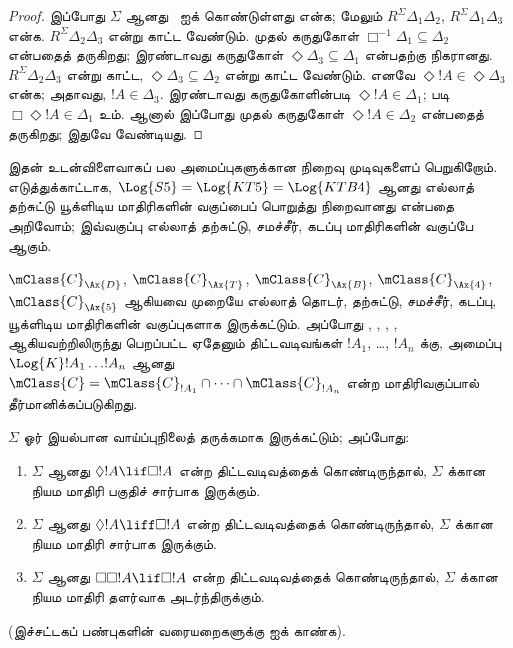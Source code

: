\documentclass[../../../include/open-logic-section]{subfiles}
\begin{document}
\begin{proof}
  இப்போது $\Sigma$ ஆனது~ ஐக் கொண்டுள்ளது என்க; மேலும்
  $R^\Sigma \Delta_1\Delta_2$, $R^\Sigma \Delta_1\Delta_3$ என்க.
  $R^\Sigma \Delta_2\Delta_3$ என்று காட்ட வேண்டும். முதல் கருதுகோள்
  $\Box^{-1}\Delta_1 \subseteq \Delta_2$ என்பதைத் தருகிறது; இரண்டாவது கருதுகோள்
  $\Diamond\Delta_3 \subseteq \Delta_1$ என்பதற்கு நிகரானது. $R^\Sigma
  \Delta_2\Delta_3$ என்று காட்ட,
  $\Diamond\Delta_3 \subseteq \Delta_2$ என்று காட்ட வேண்டும்.
  எனவே $\Diamond!A \in \Diamond\Delta_3$ என்க; அதாவது,
  $!A \in \Delta_3$. இரண்டாவது கருதுகோளின்படி $\Diamond!A \in \Delta_1$;
   படி $\Box\Diamond!A \in \Delta_1$ உம். ஆனால் இப்போது முதல்
  கருதுகோள் $\Diamond!A \in \Delta_2$ என்பதைத் தருகிறது; இதுவே வேண்டியது.
  \end{proof}

இதன் உடன்விளைவாகப் பல அமைப்புகளுக்கான நிறைவு முடிவுகளைப் பெறுகிறோம்.
எடுத்துக்காட்டாக, $\Log{S5} = \Log{KT5} = \Log{KTB4}$ ஆனது எல்லாத்
தற்சுட்டு யூக்ளிடிய மாதிரிகளின் வகுப்பைப் பொறுத்து நிறைவானது என்பதை அறிவோம்;
இவ்வகுப்பு எல்லாத் தற்சுட்டு, சமச்சீர், கடப்பு மாதிரிகளின் வகுப்பே ஆகும்.

\begin{thm}
  $\mClass{C}_\Ax{D}$, $\mClass{C}_\Ax{T}$,
  $\mClass{C}_\Ax{B}$, $\mClass{C}_\Ax{4}$, $\mClass{C}_\Ax{5}$ ஆகியவை
  முறையே எல்லாத் தொடர், தற்சுட்டு, சமச்சீர், கடப்பு, யூக்ளிடிய மாதிரிகளின்
  வகுப்புகளாக இருக்கட்டும். அப்போது , , , ,
   ஆகியவற்றிலிருந்து பெறப்பட்ட ஏதேனும் திட்டவடிவங்கள் $!A_1$,
  \dots, $!A_n$ க்கு, அமைப்பு $\Log{K}!A_1 \dots !A_n$ ஆனது
  $\mClass{C} = \mClass{C}_{!A_1} \cap \dots
  \cap \mClass{C}_{!A_n}$ என்ற மாதிரிவகுப்பால் தீர்மானிக்கப்படுகிறது.
\end{thm}

\begin{prop}
  $\Sigma$ ஓர் இயல்பான வாய்ப்புநிலைத் தருக்கமாக இருக்கட்டும்; அப்போது:
  \begin{enumerate}
  \item{}%
    $\Sigma$ ஆனது $\Diamond!A \lif \Box !A$ என்ற திட்டவடிவத்தைக்
    கொண்டிருந்தால், $\Sigma$ க்கான நியம மாதிரி பகுதிச் சார்பாக இருக்கும்.
  \item $\Sigma$ ஆனது $\Diamond!A \liff \Box !A$ என்ற திட்டவடிவத்தைக்
    கொண்டிருந்தால், $\Sigma$ க்கான நியம மாதிரி சார்பாக இருக்கும்.
  \item $\Sigma$ ஆனது $\Box\Box!A \lif \Box !A$ என்ற திட்டவடிவத்தைக்
    கொண்டிருந்தால், $\Sigma$ க்கான நியம மாதிரி தளர்வாக அடர்ந்திருக்கும்.
  \end{enumerate}
(இச்சட்டகப் பண்புகளின் வரையறைகளுக்கு
   ஐக் காண்க).
\end{prop}
\end{document}
